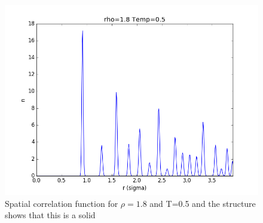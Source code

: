 \documentclass[12pt,a4paper]{report}
\begin{document}
\begin{figure}[H]
\centering
\includegraphics[scale=0.5]{Correlation_rho18_T05_rm35_2.png}
\caption{Spatial correlation function for $\rho =1.8$ and T=0.5 and the structure shows that this is a solid}
\label{fig:solid_cor}
\end{figure}




\end{document}
